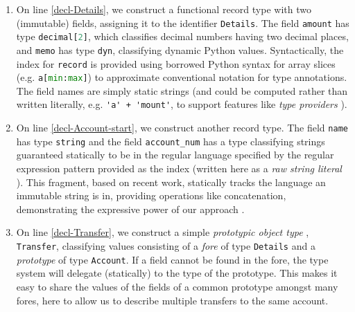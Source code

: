 \documentclass[9pt,preprint]{sigplanconf}
\newcommand{\lstinlinep}[1]{\lstinline[language=Python,basicstyle=\ttfamily\small]{#1}}
\begin{document}
\begin{enumerate}
\item On line \ref{decl-Details}, we construct a functional record type with two (immutable) fields, assigning it to the identifier \lstinlinep{Details}. The field \lstinlinep{amount} has type \lstinlinep{decimal[2]}, which classifies decimal numbers having two decimal places, and \lstinlinep{memo} has type \lstinlinep{dyn}, classifying dynamic Python values.  %
Syntactically, the index for \lstinlinep{record} is provided using borrowed Python  syntax for array slices (e.g. \lstinlinep{a[min:max]}) to approximate conventional notation for type annotations. The field names are simply static strings (and could be computed rather than written literally, e.g. \lstinline{'a' + 'mount'}, to support features like \emph{type providers} \cite{Syme:2013:TIF:2429376.2429378}). 
\item On line \ref{decl-Account-start}, we construct another record type. The field \lstinlinep{name} has type \lstinlinep{string} and the field \lstinlinep{account_num} has a type classifying strings guaranteed statically to be in the regular language specified  by the  regular expression pattern provided as the index (written here as a \emph{raw string literal} \cite{python}). This  fragment, based on recent work, statically tracks the language an immutable string is in, providing operations like concatenation, demonstrating the expressive power of our approach \cite{fulton-thesis}. %
\item 
On line \ref{decl-Transfer}, we construct a simple \emph{prototypic object type} \cite{Lie86}, \lstinlinep{Transfer}, classifying values consisting of a \emph{fore} of type \lstinlinep{Details} and a \emph{prototype} of type \lstinlinep{Account}. %
 If a field cannot be found in the fore, the type system will delegate (statically) to the type of the prototype. This makes it easy to share the values of the fields of a common prototype amongst many fores, here to allow us to describe multiple transfers to the same account.%
\end{enumerate}
\end{document}
